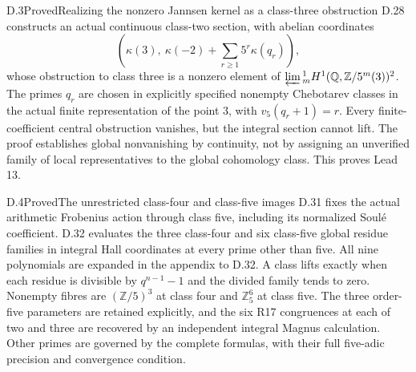 \begin{statement}{D.3}{Proved}{Realizing the nonzero Jannsen kernel as a class-three obstruction}
D.28 constructs an actual continuous class-two
section, with abelian coordinates
\[
 \left(\kappa(3),\ \kappa(-2)+
                 \sum_{r\ge1}5^r\kappa(q_r)\right),
\]
whose obstruction to class three is a nonzero
element of
\(\varprojlim{}^1_mH^1(\mathbb Q,\mathbb Z/5^m(3))^2\).
The primes \(q_r\) are chosen in explicitly
specified nonempty Chebotarev classes in the
actual finite representation of the point
\(3\), with \(v_5(q_r+1)=r\).
Every finite-coefficient central obstruction
vanishes, but the integral section cannot lift.
The proof establishes global nonvanishing by
continuity, not by assigning an unverified
family of local representatives to the global
cohomology class. This proves Lead 13.
\end{statement}

\begin{statement}{D.4}{Proved}{The unrestricted class-four and class-five images}
D.31 fixes the actual arithmetic Frobenius action
through class five, including its normalized Soul\'e
coefficient. D.32 evaluates the three class-four
and six class-five global residue families in
integral Hall coordinates at every prime other
than five. All nine polynomials are expanded in
the appendix to D.32. A class lifts exactly when
each residue is divisible by \(q^{n-1}-1\) and
the divided family tends to zero. Nonempty fibres
are \((\mathbb Z/5)^3\) at class four and
\(\mathbb Z_5^6\) at class five. The three
order-five parameters are retained explicitly,
and the six R17 congruences at each of two and
three are recovered by an independent integral
Magnus calculation. Other primes are governed by
the complete formulas, with their full five-adic
precision and convergence condition.
\end{statement}

